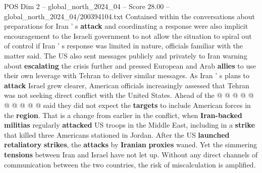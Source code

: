 \begin{textsample}{POS Dim 2 – global\_north\_2024\_04 – Score 28.00 – global\_north\_2024\_04/200394104.txt}
Contained within the conversations about preparations for Iran ' s \textbf{attack} and coordinating a response were also implicit encouragement to the Israeli government to not allow the situation to spiral out of control if Iran ' s response was limited in nature, officials familiar with the matter said.
The US also sent messages publicly and privately to Iran warning about \textbf{escalating} the crisis further and pressed European and Arab \textbf{allies} to use their own leverage with Tehran to deliver similar messages.
As Iran ' s plans to \textbf{attack} Israel grew clearer, American officials increasingly assessed that Tehran was not seeking direct conflict with the United States.
Ahead of the @ @ @ @ @ @ @ @ @ @ said they did not expect the \textbf{targets} to include American forces in the \textbf{region}.
That is a change from earlier in the conflict, when \textbf{Iran-backed} \textbf{militias} regularly \textbf{attacked} US troops in the Middle East, including in a \textbf{strike} that killed three Americans stationed in Jordan.
After the US \textbf{launched} \textbf{retaliatory} \textbf{strikes}, the \textbf{attacks} by \textbf{Iranian} \textbf{proxies} waned.
Yet the simmering \textbf{tensions} between Iran and Israel have not let up.
Without any direct channels of communication between the two countries, the risk of miscalculation is amplified.

\end{textsample}
